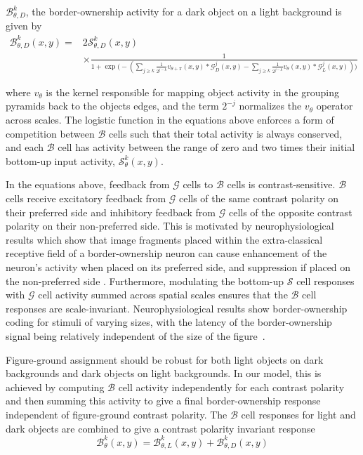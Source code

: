 $\mathcal{B}^k_{\theta,D}$, the border-ownership activity for a dark object on a light background is given by
\begin{equation}
\begin{split}
\mathcal{B}^k_{\theta,D}(x,y) = &2\mathcal{S}^k_{\theta,D}(x,y)\\
            &\times\frac{1}{1+\exp\Big(-(\sum_{j\geq k}\frac{1}{2^{j-k}} v_{\theta+\pi}(x,y) \ast \mathcal{G}^j_{D}(x,y)-\sum_{j\geq k}\frac{1}{2^{j-k}} v_{\theta}(x,y) \ast \mathcal{G}^j_{L}(x,y))\Big)}
\end{split}
\label{eq:border-orientation2}
\end{equation}

where $v_{\theta}$ is the kernel responsible for mapping object activity in the grouping pyramids back to the objects edges, and the term $2^{-j}$ normalizes the $v_{\theta}$ operator across scales. The logistic function in the equations above enforces a form of competition between $\mathcal{B}$ cells such that their total activity is always conserved, and each $\mathcal{B}$ cell has activity between the range of zero and two times their initial bottom-up input activity, $\mathcal{S}^k_{\theta}(x,y)$.

In the equations above, feedback from $\mathcal{G}$ cells to $\mathcal{B}$ cells is contrast-sensitive. $\mathcal{B}$ cells receive excitatory feedback from $\mathcal{G}$ cells of the same contrast polarity on their preferred side and inhibitory feedback from $\mathcal{G}$ cells of the opposite contrast polarity on their non-preferred side. This is motivated by neurophysiological results which show that image fragments placed within the extra-classical receptive field of a border-ownership neuron can cause enhancement of the neuron's activity when placed on its preferred side, and suppression if placed on the non-preferred side \citep{Zhang_vonderHeydt10}. Furthermore, modulating the bottom-up $\mathcal{S}$ cell responses with $\mathcal{G}$ cell activity summed across spatial scales ensures that the $\mathcal{B}$ cell responses are scale-invariant. Neurophysiological results show border-ownership coding for stimuli of varying sizes, with the latency of the border-ownership signal being relatively independent of the size of the figure~\citep{Zhou_etal00,Sugihara_etal11}.

Figure-ground assignment should be robust for both light objects on dark backgrounds and dark objects on light backgrounds. In our model, this is achieved by computing $\mathcal{B}$ cell activity independently for each contrast polarity and then summing this activity to give a final border-ownership response independent of figure-ground contrast polarity. The $\mathcal{B}$ cell responses for light and dark objects are combined to give a contrast polarity invariant response
\begin{equation}
\mathcal{B}^k_{\theta}(x,y) =
\mathcal{B}^k_{\theta,L}(x,y)+\mathcal{B}^k_{\theta,D}(x,y)
\label{eq:BOS}
\end{equation}


